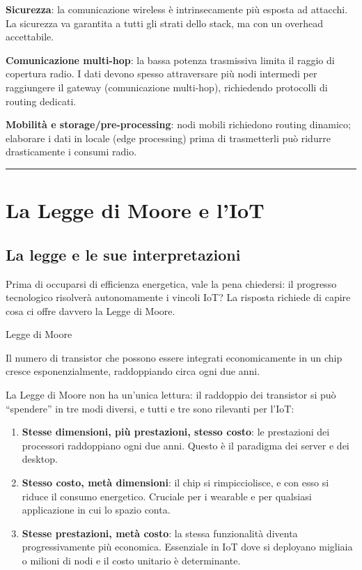 \documentclass[
  italian,
  openany]{book}
\providecommand{\tightlist}{%
  \setlength{\itemsep}{0pt}\setlength{\parskip}{0pt}}
\begin{document}
\textbf{Sicurezza}: la comunicazione wireless è intrinsecamente più
esposta ad attacchi. La sicurezza va garantita a tutti gli strati dello
stack, ma con un overhead accettabile.

\textbf{Comunicazione multi-hop}: la bassa potenza trasmissiva limita il
raggio di copertura radio. I dati devono spesso attraversare più nodi
intermedi per raggiungere il gateway (comunicazione multi-hop),
richiedendo protocolli di routing dedicati.

\textbf{Mobilità e storage/pre-processing}: nodi mobili richiedono
routing dinamico; elaborare i dati in locale (edge processing) prima di
trasmetterli può ridurre drasticamente i consumi radio.

\begin{center}\rule{0.5\linewidth}{0.5pt}\end{center}

\section{La Legge di Moore e l'IoT}\label{la-legge-di-moore-e-liot}

\subsection{La legge e le sue
interpretazioni}\label{la-legge-e-le-sue-interpretazioni}

Prima di occuparsi di efficienza energetica, vale la pena chiedersi: il
progresso tecnologico risolverà autonomamente i vincoli IoT? La risposta
richiede di capire cosa ci offre davvero la Legge di Moore.

\begin{calloutdefinition}{Legge di Moore}

Il numero di transistor che possono essere integrati economicamente in
un chip cresce esponenzialmente, raddoppiando circa ogni due anni.

\end{calloutdefinition}

La Legge di Moore non ha un'unica lettura: il raddoppio dei transistor
si può ``spendere'' in tre modi diversi, e tutti e tre sono rilevanti
per l'IoT:

\begin{enumerate}
\def\labelenumi{\arabic{enumi}.}
\tightlist
\item
  \textbf{Stesse dimensioni, più prestazioni, stesso costo}: le
  prestazioni dei processori raddoppiano ogni due anni. Questo è il
  paradigma dei server e dei desktop.
\item
  \textbf{Stesso costo, metà dimensioni}: il chip si rimpicciolisce, e
  con esso si riduce il consumo energetico. Cruciale per i wearable e
  per qualsiasi applicazione in cui lo spazio conta.
\item
  \textbf{Stesse prestazioni, metà costo}: la stessa funzionalità
  diventa progressivamente più economica. Essenziale in IoT dove si
  deployano migliaia o milioni di nodi e il costo unitario è
  determinante.
\end{enumerate}
\end{document}
